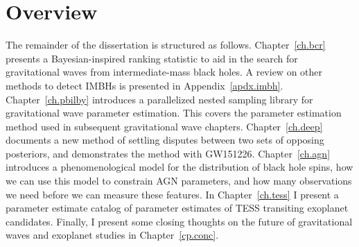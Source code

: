 \section{Overview}
The remainder of the dissertation is structured as follows.
Chapter~\ref{ch.bcr} presents a Bayesian-inspired ranking statistic to aid in the search for gravitational waves from intermediate-mass black holes.
A review on other methods to detect IMBHs is presented in Appendix~\ref{apdx.imbh}.
Chapter~\ref{ch.pbilby} introduces a parallelized nested sampling library for gravitational wave parameter estimation.
This covers the parameter estimation method used in subsequent gravitational wave chapters. 
Chapter~\ref{ch.deep} documents a new method of settling disputes between two sets of opposing posteriors, and demonstrates the method with GW151226.
Chapter~\ref{ch.agn} introduces a phenomenological model for the distribution of black hole spins, how we can use this model to constrain AGN parameters, and how many observations we need before we can measure these features. 
In Chapter~\ref{ch.tess} I present a parameter estimate catalog of parameter estimates of TESS transiting exoplanet candidates. 
Finally, I present some closing thoughts on the future of gravitational waves and exoplanet studies in Chapter~\ref{cp.conc}. 
